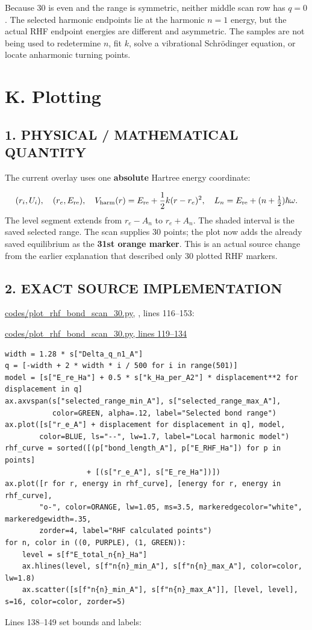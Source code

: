 \documentclass[10pt,a4paper]{article}
\begin{document}
Because 30 is even and the range is symmetric, neither middle scan row has \(q=0\). The selected harmonic endpoints lie at the harmonic \(n=1\) energy, but the actual RHF endpoint energies are different and asymmetric. The samples are not being used to redetermine \(n\), fit \(k\), solve a vibrational Schrödinger equation, or locate anharmonic turning points.

\clearpage
\section{K. Plotting}
\subsection{1. PHYSICAL / MATHEMATICAL QUANTITY}
The current overlay uses one \textbf{absolute} Hartree energy coordinate:

\[
(r_i,U_i),\quad(r_e,E_{\rm re}),\quad
V_{\rm harm}(r)=E_{\rm re}+\frac12k(r-r_e)^2,\quad
L_n=E_{\rm re}+(n+\tfrac12)\hbar\omega.
\]
The level segment extends from \(r_e-A_n\) to \(r_e+A_n\). The shaded interval is the saved selected range. The scan supplies 30 points; the plot now adds the already saved equilibrium as the \textbf{31st orange marker}. This is an actual source change from the earlier explanation that described only 30 plotted RHF markers.

\subsection{2. EXACT SOURCE IMPLEMENTATION}
\href{/Users/novaz/Desktop/qml2.0/codes/plot\_rhf\_bond\_scan\_30.py:116}{codes/plot\_rhf\_bond\_scan\_30.py}, , lines 116–153:

\href{/Users/novaz/Desktop/qml2.0/codes/plot\_rhf\_bond\_scan\_30.py:119}{codes/plot\_rhf\_bond\_scan\_30.py, lines 119–134}

\begin{Verbatim}
width = 1.28 * s["Delta_q_n1_A"]
q = [-width + 2 * width * i / 500 for i in range(501)]
model = [s["E_re_Ha"] + 0.5 * s["k_Ha_per_A2"] * displacement**2 for displacement in q]
ax.axvspan(s["selected_range_min_A"], s["selected_range_max_A"],
           color=GREEN, alpha=.12, label="Selected bond range")
ax.plot([s["r_e_A"] + displacement for displacement in q], model,
        color=BLUE, ls="--", lw=1.7, label="Local harmonic model")
rhf_curve = sorted([(p["bond_length_A"], p["E_RHF_Ha"]) for p in points]
                   + [(s["r_e_A"], s["E_re_Ha"])])
ax.plot([r for r, energy in rhf_curve], [energy for r, energy in rhf_curve],
        "o-", color=ORANGE, lw=1.05, ms=3.5, markeredgecolor="white", markeredgewidth=.35,
        zorder=4, label="RHF calculated points")
for n, color in ((0, PURPLE), (1, GREEN)):
    level = s[f"E_total_n{n}_Ha"]
    ax.hlines(level, s[f"n{n}_min_A"], s[f"n{n}_max_A"], color=color, lw=1.8)
    ax.scatter([s[f"n{n}_min_A"], s[f"n{n}_max_A"]], [level, level], s=16, color=color, zorder=5)
\end{Verbatim}
Lines 138–149 set bounds and labels:
\end{document}
